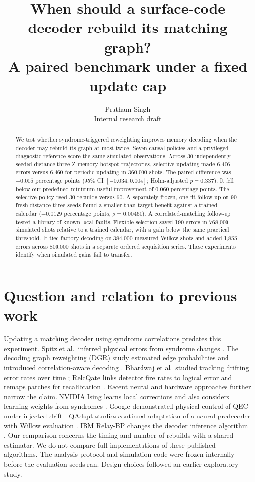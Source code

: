 \documentclass[10pt]{article}
\title{When should a surface-code decoder rebuild its matching graph?\\ \large A paired benchmark under a fixed update cap}
\author{Pratham Singh\\ \small Internal research draft}
\date{}
\begin{document}
\maketitle
\begin{abstract}
We test whether syndrome-triggered reweighting improves memory decoding when the decoder may rebuild its graph at most twice. Seven causal policies and a privileged diagnostic reference score the same simulated observations. Across 30 independently seeded distance-three Z-memory hotspot trajectories, selective updating made 6,406 errors versus 6,460 for periodic updating in 360,000 shots. The paired difference was $-0.015$ percentage points (95\% CI $[-0.034,0.004]$; Holm-adjusted $p=0.337$). It fell below our predefined minimum useful improvement of 0.060 percentage points. The selective policy used 30 rebuilds versus 60. A separately frozen, one-fit follow-up on 90 fresh distance-three seeds found a smaller-than-target benefit against a trained calendar ($-0.0129$ percentage points, $p=0.00460$). A correlated-matching follow-up tested a library of known local faults. Flexible selection saved 190 errors in 768,000 simulated shots relative to a trained calendar, with a gain below the same practical threshold. It tied factory decoding on 384,000 measured Willow shots and added 1,855 errors across 800,000 shots in a separate ordered acquisition series. These experiments identify when simulated gains fail to transfer.
\end{abstract}

\section{Question and relation to previous work}
Updating a matching decoder using syndrome correlations predates this experiment. Spitz et al.\ inferred physical errors from syndrome changes \cite{spitz}. The decoding graph reweighting (DGR) study estimated edge probabilities and introduced correlation-aware decoding \cite{dgr}. Bhardwaj et al.\ studied tracking drifting error rates over time \cite{bhardwaj}; ReloQate links detector fire rates to logical error and remaps patches for recalibration \cite{relo}. Recent neural and hardware approaches further narrow the claim. NVIDIA Ising learns local corrections and also considers learning weights from syndromes \cite{ising}. Google demonstrated physical control of QEC under injected drift \cite{googlecontrol}. QAdapt studies continual adaptation of a neural predecoder with Willow evaluation \cite{qadapt}. IBM Relay-BP changes the decoder inference algorithm \cite{relay}. Our comparison concerns the timing and number of rebuilds with a shared estimator. We do not compare full implementations of these published algorithms. The analysis protocol and simulation code were frozen internally before the evaluation seeds ran. Design choices followed an earlier exploratory study.
\end{document}
